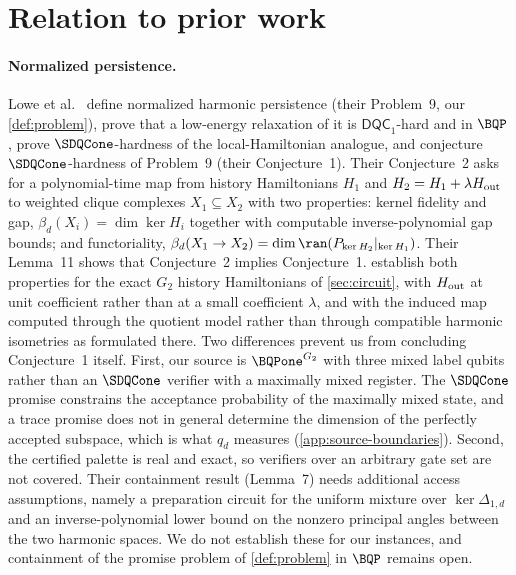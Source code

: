 \section{Relation to prior work}
\label{sec:related}

\paragraph{Normalized persistence.}
Lowe et al.~\cite{lowe2026normalized} define normalized harmonic persistence
(their Problem~9, our \cref{def:problem}), prove that a low-energy relaxation
of it is \(\mathsf{DQC}_1\)-hard and in \(\BQP\), prove \(\SDQCone\)-hardness
of the local-Hamiltonian analogue, and conjecture \(\SDQCone\)-hardness of
Problem~9 (their Conjecture~1).  Their Conjecture~2 asks for a polynomial-time
map from history Hamiltonians \(H_1\) and \(H_2=H_1+\lambda H_{\rm out}\) to
weighted clique complexes \(X_1\subseteq X_2\) with two properties:
kernel fidelity and gap, \(\beta_d(X_i)=\dim\ker H_i\) together with
computable inverse-polynomial gap bounds; and functoriality,
\(\beta_d(X_1\to X_2)=\dim\ran(P_{\ker H_2}|_{\ker H_1})\).  Their Lemma~11
shows that Conjecture~2 implies Conjecture~1.  
establish both properties for the exact \(G_2\) history Hamiltonians of
\cref{sec:circuit}, with \(H_{\rm out}\) at unit coefficient rather than at a
small coefficient \(\lambda\), and with the induced map computed through the
quotient model rather than through compatible harmonic isometries as
formulated there.  Two differences prevent us from concluding Conjecture~1
itself.  First, our source is \(\BQPone^{G_2}\) with three mixed label
qubits rather than an \(\SDQCone\) verifier with a maximally mixed register.
The \(\SDQCone\) promise constrains the acceptance probability of the
maximally mixed state, and a trace promise does not in general determine the
dimension of the perfectly accepted subspace, which is what \(q_d\) measures
(\cref{app:source-boundaries}).  Second, the certified palette is real and
exact, so verifiers over an arbitrary gate set are not covered.  Their
containment result (Lemma~7) needs additional access assumptions, namely a
preparation circuit for the uniform mixture over \(\ker\Delta_{1,d}\) and an
inverse-polynomial lower bound on the nonzero principal angles between the
two harmonic spaces.  We do not establish these for our instances, and
containment of the promise problem of \cref{def:problem} in \(\BQP\) remains
open.

